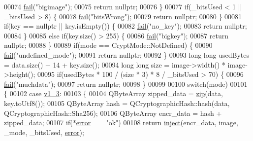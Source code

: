 \begin{DoxyCode}
00074         \hyperlink{class_model_p_c_a47464b59b7e37fcee25e55475708aabd}{fail}(\textcolor{stringliteral}{"bigimage"});
00075         \textcolor{keywordflow}{return} \textcolor{keyword}{nullptr};
00076     \}
00077     \textcolor{keywordflow}{if}(\_bitsUsed < 1 || \_bitsUsed > 8) \{
00078         \hyperlink{class_model_p_c_a47464b59b7e37fcee25e55475708aabd}{fail}(\textcolor{stringliteral}{"bitsWrong"});
00079         \textcolor{keywordflow}{return} \textcolor{keyword}{nullptr};
00080     \}
00081     \textcolor{keywordflow}{if}(key == \textcolor{keyword}{nullptr} || key.isEmpty()) \{
00082         \hyperlink{class_model_p_c_a47464b59b7e37fcee25e55475708aabd}{fail}(\textcolor{stringliteral}{"no\_key"});
00083         \textcolor{keywordflow}{return} \textcolor{keyword}{nullptr};
00084     \}
00085     \textcolor{keywordflow}{else} \textcolor{keywordflow}{if}(key.size() > 255) \{
00086         \hyperlink{class_model_p_c_a47464b59b7e37fcee25e55475708aabd}{fail}(\textcolor{stringliteral}{"bigkey"});
00087         \textcolor{keywordflow}{return} \textcolor{keyword}{nullptr};
00088     \}
00089     \textcolor{keywordflow}{if}(mode == CryptMode::NotDefined) \{
00090         \hyperlink{class_model_p_c_a47464b59b7e37fcee25e55475708aabd}{fail}(\textcolor{stringliteral}{"undefined\_mode"});
00091         \textcolor{keywordflow}{return} \textcolor{keyword}{nullptr};
00092     \}
00093     \textcolor{keywordtype}{long} \textcolor{keywordtype}{long} usedBytes = data.size() + 14 + key.size();
00094     \textcolor{keywordtype}{long} \textcolor{keywordtype}{long} size = image->width() * image->height();
00095     \textcolor{keywordflow}{if}(usedBytes * 100 / (size * 3) * 8 / \_bitsUsed > 70) \{
00096         \hyperlink{class_model_p_c_a47464b59b7e37fcee25e55475708aabd}{fail}(\textcolor{stringliteral}{"muchdata"});
00097         \textcolor{keywordflow}{return} \textcolor{keyword}{nullptr};
00098     \}
00099 
00100     \textcolor{keywordflow}{switch}(mode)
00101     \{
00102         \textcolor{keywordflow}{case} \hyperlink{class_model_p_c_a296dd7afe3e1c49b3da25fd644fe4ceba7612e38de7178170655a56ddcf96e12c}{v1\_3}:
00103         \{
00104             QByteArray zipped\_data = \hyperlink{class_model_p_c_afebbbfa4b07deba4f68fc6dfb50f353f}{zip}(data, key.toUtf8());
00105             QByteArray hash = QCryptographicHash::hash(data, QCryptographicHash::Sha256);
00106             QByteArray encr\_data = hash + zipped\_data;
00107             \textcolor{keywordflow}{if}(*\hyperlink{class_model_p_c_a4e5a9c0ca1f06fe5bc478b6bf248c37c}{error} == \textcolor{stringliteral}{"ok"})
00108                 \textcolor{keywordflow}{return} \hyperlink{class_model_p_c_aada6a04d81ada8f2b4ba18108c8d6f10}{inject}(encr\_data, image, \_mode, \_bitsUsed, \hyperlink{class_model_p_c_a4e5a9c0ca1f06fe5bc478b6bf248c37c}{error});

\end{DoxyCode}
